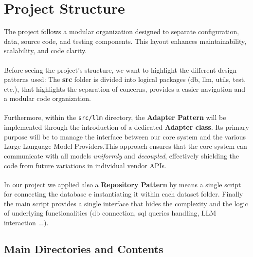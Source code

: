 \documentclass[12pt,a4paper]{article}
\begin{document}
\newpage
\section{Project Structure}

The project follows a modular organization designed to separate configuration, data, source code, and testing components.  
This layout enhances maintainability, scalability, and code clarity.
\\\\
Before seeing the project's structure, we want to highlight the different design patterns used: 
The \textbf{src} folder is divided into logical packages (db, llm, utils, test, etc.), that highlights the separation of concerns, provides a easier navigation and a modular code organization.\\\\
Furthermore, within the \texttt{src/llm} directory, the \textbf{Adapter Pattern} will be implemented through the introduction of a dedicated \textbf{Adapter class}.
Its primary purpose will be to manage the interface between our core system and the various Large Language Model Providers.This approach ensures that the core system can communicate with all models \textit{uniformly} and \textit{decoupled}, effectively shielding the code from future variations in individual vendor APIs.\\\\
In our project we applied also  a \textbf{Repository Pattern} by means a single script for connecting the database e instantiating it within each dataset folder.
Finally the main script provides a single interface that hides the complexity and the logic of underlying functionalities (db connection, sql queries handling, LLM interaction ...). 

\subsection{Main Directories and Contents}
\end{document}
